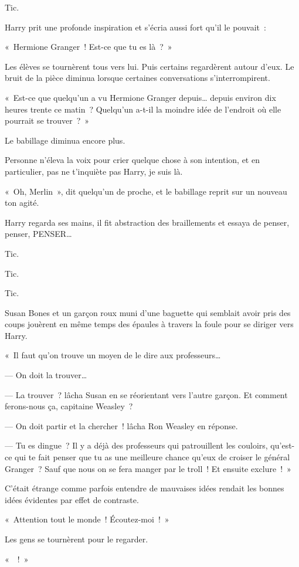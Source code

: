 Tic.

Harry prit une profonde inspiration et s'écria aussi fort qu'il le pouvait~:

«~Hermione Granger~!
Est-ce que tu es là~?~»

Les élèves se tournèrent tous vers lui.
Puis certains regardèrent autour d'eux.
Le bruit de la pièce diminua lorsque certaines conversations s'interrompirent.

«~Est-ce que quelqu'un a vu Hermione Granger depuis… depuis environ dix heures trente ce matin~?
Quelqu'un a-t-il la moindre idée de l'endroit où elle pourrait se trouver~?~»

Le babillage diminua encore plus.

Personne n'éleva la voix pour crier quelque chose à son intention, et en particulier, pas ne t'inquiète pas Harry, je suis là.

«~Oh, Merlin~», dit quelqu'un de proche, et le babillage reprit sur un nouveau ton agité.

Harry regarda ses mains, il fit abstraction des braillements et essaya de penser, penser, PENSER…

Tic.

Tic.

Tic.

Susan Bones et un garçon roux muni d'une baguette qui semblait avoir pris des coups jouèrent en même temps des épaules à travers la foule pour se diriger vers Harry.

«~Il faut qu'on trouve un moyen de le dire aux professeurs…

--- On doit la trouver…

--- La trouver~? lâcha Susan en se réorientant vers l'autre garçon.
Et comment ferons-nous ça, capitaine Weasley~?

--- On doit partir et la chercher~! lâcha Ron Weasley en réponse.

--- Tu es dingue~?
Il y a déjà des professeurs qui patrouillent les couloirs, qu'est-ce qui te fait penser que tu as une meilleure chance qu'eux de croiser le général Granger~?
Sauf que nous on se fera manger par le troll~!
Et ensuite exclure~!~»

C'était étrange comme parfois entendre de mauvaises idées rendait les bonnes idées évidentes par effet de contraste.

«~Attention tout le monde~!
Écoutez-moi~!~»

Les gens se tournèrent pour le regarder.

«~~!~»

